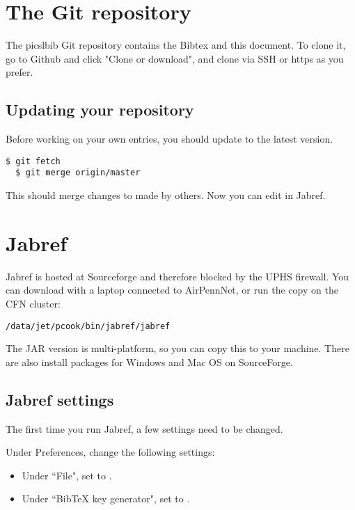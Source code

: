 \documentclass{InsightArticle}
\begin{document}
\section{The Git repository}

The picslbib Git repository contains the Bibtex and this document. To clone it, go to Github and click "Clone or download", and clone via SSH or https as you prefer.



\subsection{Updating your repository}

Before working on your own entries, you should update to the latest version.
\begin{lstlisting}[style=bash]
  $ git fetch
  $ git merge origin/master
\end{lstlisting}

This should merge changes to  made by others. Now you can edit  in Jabref.

\section{Jabref}

Jabref is hosted at Sourceforge and therefore blocked by the UPHS firewall. You can download with a laptop connected to AirPennNet, or run the copy on the CFN cluster:
\begin{lstlisting}[style=bash]
  /data/jet/pcook/bin/jabref/jabref 
\end{lstlisting}
The JAR version is multi-platform, so you can copy this to your machine. There are also install packages for Windows and Mac OS on SourceForge.

\subsection{Jabref settings}

The first time you run Jabref, a few settings need to be changed.

Under Preferences, change the following settings:
\begin{itemize}
\item Under ``File", set  to .
\item Under ``BibTeX key generator", set  to .
\end{itemize}
\end{document}
